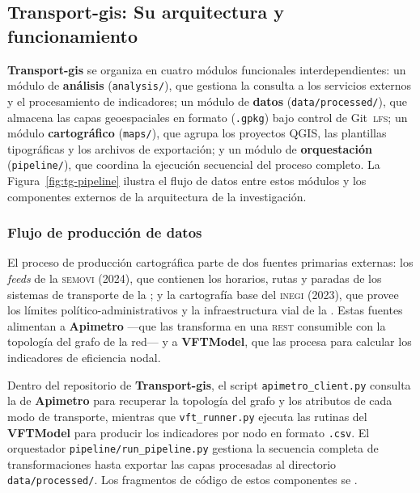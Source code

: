 \subsection{Transport-gis: Su arquitectura y funcionamiento}
\label{subsec:transport-gis-arquitectura-funcionamiento}

\textbf{Transport-gis} se organiza en cuatro módulos funcionales interdependientes: un módulo de \textbf{análisis} (\texttt{analysis/}), que gestiona la consulta a los servicios 
externos y el procesamiento de indicadores; un módulo de \textbf{datos} (\texttt{data/processed/}), que almacena las capas geoespaciales en formato  (\texttt{.gpkg}) 
bajo control de Git~\textsc{lfs}; un módulo \textbf{cartográfico} (\texttt{maps/}), que agrupa los proyectos QGIS, las plantillas tipográficas y los archivos de exportación; y un 
módulo de \textbf{orquestación} (\texttt{pipeline/}), que coordina la ejecución secuencial del proceso completo. La Figura~\ref{fig:tg-pipeline} ilustra el flujo de datos 
entre estos módulos y los componentes externos de la arquitectura de la investigación.

\subsubsection{Flujo de producción de datos}
\label{subsubsec:tg-flujo-datos}

El proceso de producción cartográfica parte de dos fuentes primarias externas: los \textit{feeds} \gtfs{} de la \textsc{semovi} (2024), que contienen los horarios, 
rutas y paradas de los sistemas de transporte de la \cdmx{}; y la cartografía base del \textsc{inegi} (2023), que provee los límites político-administrativos y la 
infraestructura vial de la \zmvm{}. Estas fuentes alimentan a \textbf{Apimetro} —que las transforma en una \api{} \textsc{rest} consumible con la topología del 
grafo de la red— y a \textbf{VFTModel}, que las procesa para calcular los indicadores de eficiencia nodal.

Dentro del repositorio de \textbf{Transport-gis}, el script \texttt{apimetro\_client.py} consulta la \api{} de \textbf{Apimetro} para recuperar la topología del 
grafo y los atributos de cada modo de transporte, mientras que \texttt{vft\_runner.py} ejecuta las rutinas del \textbf{VFTModel} para producir los indicadores por nodo en 
formato \texttt{.csv}. El orquestador \texttt{pipeline/run\_pipeline.py} gestiona la secuencia completa de transformaciones hasta exportar las capas procesadas al 
directorio \texttt{data/processed/}. Los fragmentos de código de estos componentes se \DIFdelbegin {}\DIFdelend \DIFaddbegin {}\DIFaddend .

